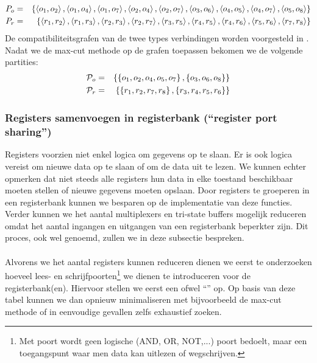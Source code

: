 \begin{eqnarray}
P_o&=&\left\{ \left\langle o_1,o_2 \right\rangle,\left\langle o_1,o_4 \right\rangle,\left\langle o_1,o_7 \right\rangle,\left\langle o_2,o_4 \right\rangle,\left\langle o_2,o_7 \right\rangle,\left\langle o_3,o_6 \right\rangle,\left\langle o_4,o_5 \right\rangle,\left\langle o_4,o_7 \right\rangle,\left\langle o_5,o_8 \right\rangle \right\}\\
P_r&=&\left\{ \left\langle r_1,r_2 \right\rangle,\left\langle r_1,r_3 \right\rangle,\left\langle r_2,r_3 \right\rangle,\left\langle r_2,r_7 \right\rangle,\left\langle r_3,r_5 \right\rangle,\left\langle r_4,r_5 \right\rangle,\left\langle r_4,r_6 \right\rangle,\left\langle r_5,r_6 \right\rangle,\left\langle r_7,r_8 \right\rangle \right\}
\end{eqnarray}
De compatibiliteitsgrafen van de twee types verbindingen worden voorgesteld in . Nadat we de max-cut methode op de grafen toepassen bekomen we de volgende partities:
\begin{eqnarray}
\mathcal{P}_o&=&\left\{ \left\{ o_1,o_2,o_4,o_5,o_7 \right\},\left\{ o_3,o_6,o_8 \right\} \right\}\\
\mathcal{P}_r&=&\left\{ \left\{ r_1,r_2,r_7,r_8 \right\},\left\{ r_3,r_4,r_5,r_6 \right\} \right\}
\end{eqnarray}
\subsubsection{Registers samenvoegen in registerbank (``register port sharing'')}
Registers voorzien niet enkel logica om gegevens op te slaan. Er is ook logica vereist om nieuwe data op te slaan of om de data uit te lezen. We kunnen echter opmerken dat niet steeds alle registers hun data in elke toestand beschikbaar moeten stellen of nieuwe gegevens moeten opslaan. Door registers te groeperen in een registerbank kunnen we besparen op de implementatie van deze functies. Verder kunnen we het aantal multiplexers en tri-state buffers mogelijk reduceren omdat het aantal ingangen en uitgangen van een registerbank beperkter zijn. Dit proces, ook wel  genoemd, zullen we in deze subsectie bespreken.
\paragraph{}
Alvorens we het aantal registers kunnen reduceren dienen we eerst te onderzoeken hoeveel lees- en schrijfpoorten\footnote{Met poort wordt geen logische (AND, OR, NOT,...) poort bedoelt, maar een toegangspunt waar men data kan uitlezen of wegschrijven.} we dienen te introduceren voor de registerbank(en). Hiervoor stellen we eerst een  ofwel ``'' op. Op basis van deze tabel kunnen we dan opnieuw minimaliseren met bijvoorbeeld de max-cut methode of in eenvoudige gevallen zelfs exhaustief zoeken.
